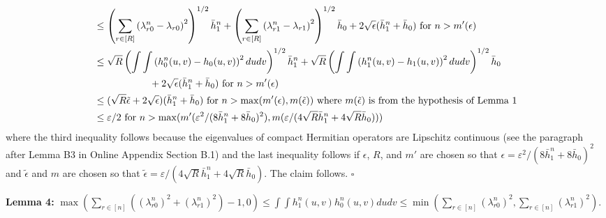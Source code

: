 \documentclass[12pt]{article}
\theoremstyle{definition}
\begin{document}
\begin{flushleft}
\begin{align*}
&\leq \left(\sum_{r \in [R]}\left(\lambda^{n}_{r0}-\lambda_{r0}\right)^{2}\right)^{1/2}\bar{h}^{n}_{1} + \left(\sum_{r \in [R]}\left(\lambda^{n}_{r1}-\lambda_{r1}\right)^{2}\right)^{1/2}\bar{h}_{0} + 2\sqrt{\epsilon}(\bar{h}^{n}_{1}+\bar{h}_{0}) \text{ for $n > m'(\epsilon)$}  \\
&\leq \sqrt{R} \left(\int\int\left(h^{n}_{0}(u,v) - h_{0}(u,v)\right)^{2}dudv \right)^{1/2}\bar{h}^{n}_{1} + \sqrt{R} \left(\int\int\left(h^{n}_{1}(u,v) - h_{1}(u,v)\right)^{2}dudv \right)^{1/2}\bar{h}_{0}  \\
&\hspace{20mm}+ 2\sqrt{\epsilon}(\bar{h}^{n}_{1}+\bar{h}_{0}) \text{ for $n > m'(\epsilon)$} \\
&\leq (\sqrt{R}\tilde{\epsilon} + 2\sqrt{\epsilon}) (\bar{h}^{n}_{1} + \bar{h}_{0}) \text{ for $n > \max(m'(\epsilon),m(\tilde{\epsilon}))$ where $m(\tilde{\epsilon})$ is from the hypothesis of Lemma 1}\\
&\leq  \varepsilon/2 \text{ for $n > \max(m'(\varepsilon^{2}/(8\bar{h}^{n}_{1} + 8\bar{h}_{0})^{2}),m( \varepsilon /(4\sqrt{R}\bar{h}^{n}_{1} + 4\sqrt{R}\bar{h}_{0}) ))$}
\end{align*}
where the third inequality follows because the eigenvalues of compact Hermitian operators are Lipschitz continuous (see the paragraph after Lemma B3 in Online Appendix Section B.1) and the last inequality follows if $\epsilon$, $R$, and $m'$ are chosen so that $\epsilon = \varepsilon^{2}/(8\bar{h}^{n}_{1} + 8\bar{h}_{0})^{2}$ and $\tilde{\epsilon}$ and $m$ are chosen so that $\tilde{\epsilon} = \varepsilon /(4\sqrt{R}\bar{h}^{n}_{1} + 4\sqrt{R}\bar{h}_{0}) $. The claim follows.  $\square$
\end{flushleft}


\begin{flushleft}
\textbf{Lemma 4:} $\max\left(\sum_{r \in [n]}\left((\lambda_{r0}^{n})^{2}+(\lambda_{r1}^{n})^{2}\right) - 1,0\right) \leq  \int\int h^{n}_{1}(u,v)h^{n}_{0}(u,v)dudv \leq \min\left(\sum_{r \in [n]}(\lambda_{r0}^{n})^{2},\sum_{r \in [n]}(\lambda_{r1}^{n})^{2}\right)$.
\end{flushleft}
\end{document}
